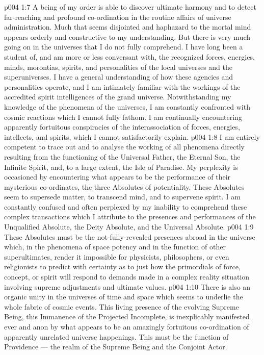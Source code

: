 \vs p004 1:7 \pc A being of my order is able to discover ultimate harmony and to detect far\hyp{}reaching and profound co\hyp{}ordination in the routine affairs of universe administration. Much that seems disjointed and haphazard to the mortal mind appears orderly and constructive to my understanding. But there is very much going on in the universes that I do not fully comprehend. I have long been a student of, and am more or less conversant with, the recognized forces, energies, minds, morontias, spirits, and personalities of the local universes and the superuniverses. I have a general understanding of how these agencies and personalities operate, and I am intimately familiar with the workings of the accredited spirit intelligences of the grand universe. Notwithstanding my knowledge of the phenomena of the universes, I am constantly confronted with cosmic reactions which I cannot fully fathom. I am continually encountering apparently fortuitous conspiracies of the interassociation of forces, energies, intellects, and spirits, which I cannot satisfactorily explain.
\vs p004 1:8 I am entirely competent to trace out and to analyse the working of all phenomena directly resulting from the functioning of the Universal Father, the Eternal Son, the Infinite Spirit, and, to a large extent, the Isle of Paradise. My perplexity is occasioned by encountering what appears to be the performance of their mysterious co\hyp{}ordinates, the three Absolutes of potentiality. These Absolutes seem to supersede matter, to transcend mind, and to supervene spirit. I am constantly confused and often perplexed by my inability to comprehend these complex transactions which I attribute to the presences and performances of the Unqualified Absolute, the Deity Absolute, and the Universal Absolute.
\vs p004 1:9 These Absolutes must be the not\hyp{}fully\hyp{}revealed presences abroad in the universe which, in the phenomena of space potency and in the function of other superultimates, render it impossible for physicists, philosophers, or even religionists to predict with certainty as to just how the primordials of force, concept, or spirit will respond to demands made in a complex reality situation involving supreme adjustments and ultimate values.
\vs p004 1:10 \pc There is also an organic unity in the universes of time and space which seems to underlie the whole fabric of cosmic events. This living presence of the evolving Supreme Being, this Immanence of the Projected Incomplete, is inexplicably manifested ever and anon by what appears to be an amazingly fortuitous co\hyp{}ordination of apparently unrelated universe happenings. This must be the function of Providence --- the realm of the Supreme Being and the Conjoint Actor.

